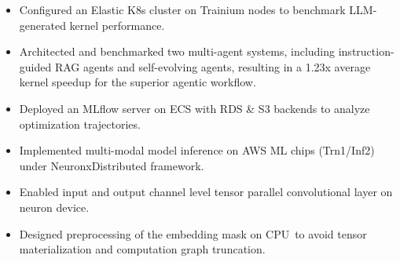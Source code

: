 \documentclass[10pt,a4paper]{altacv}
\begin{document}
\vspace{1pt}

\begin{itemize}
	\item Configured an Elastic K8s cluster on Trainium nodes to benchmark LLM-generated kernel performance.
	\item Architected and benchmarked two multi-agent systems, including instruction-guided RAG agents and self-evolving agents, resulting in a 1.23x average kernel speedup for the superior agentic workflow.
	\item Deployed an MLflow server on ECS with RDS \& S3 backends to analyze optimization trajectories.
\end{itemize}

\begin{itemize}
	\item Implemented multi-modal model inference on AWS  ML chips (Trn1/Inf2) under NeuronxDistributed framework.
	\item Enabled input and output channel level tensor parallel convolutional layer on neuron device.
	\item Designed preprocessing of the embedding mask on CPU\ to avoid tensor materialization and computation graph truncation.
\end{itemize}
%
\end{document}

